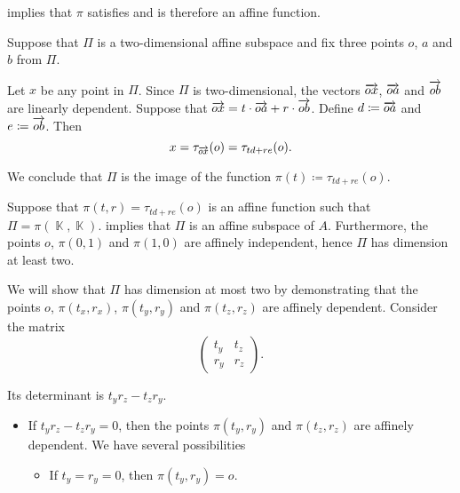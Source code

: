 \begin{defproof}
    implies that \( \pi \) satisfies  and is therefore an affine function.

   Suppose that \( \Pi \) is a two-dimensional affine subspace and fix three points \( o \), \( a \) and \( b \) from \( \Pi \).

  Let \( x \) be any point in \( \Pi \). Since \( \Pi \) is two-dimensional, the vectors \( \overrightarrow{ox} \), \( \overrightarrow{oa} \) and \( \overrightarrow{ob} \) are linearly dependent. Suppose that \( \overrightarrow{ox} = t \cdot \overrightarrow{oa} + r \cdot \overrightarrow{ob} \). Define \( d \coloneqq \overrightarrow{oa} \) and \( e \coloneqq \overrightarrow{ob} \). Then
  \begin{equation*}
    x = \tau_{\overrightarrow{ox}}(o) = \tau_{td + re}(o).
  \end{equation*}

  We conclude that \( \Pi \) is the image of the function \( \pi(t) \coloneqq \tau_{td + re}(o) \).

   Suppose that \( \pi(t, r) = \tau_{td + re}(o) \) is an affine function such that \( \Pi = \pi(\BbbK, \BbbK) \).  implies that \( \Pi \) is an affine subspace of \( A \). Furthermore, the points \( o \), \( \pi(0, 1) \) and \( \pi(1, 0) \) are affinely independent, hence \( \Pi \) has dimension at least two.

  We will show that \( \Pi \) has dimension at most two by demonstrating that the points \( o \), \( \pi(t_x, r_x) \), \( \pi(t_y, r_y) \) and \( \pi(t_z, r_z) \) are affinely dependent. Consider the matrix
  \begin{equation*}
    \begin{pmatrix}
      t_y & t_z \\
      r_y & r_z
    \end{pmatrix}.
  \end{equation*}

  Its determinant is \( t_y r_z - t_z r_y \).

  \begin{itemize}
    \item If \( t_y r_z - t_z r_y = 0 \), then the points \( \pi(t_y, r_y) \) and \( \pi(t_z, r_z) \) are affinely dependent. We have several possibilities
    \begin{itemize}
      \item If \( t_y = r_y = 0 \), then \( \pi(t_y, r_y) = o \).


\end{itemize}
\end{itemize}
\end{defproof}
